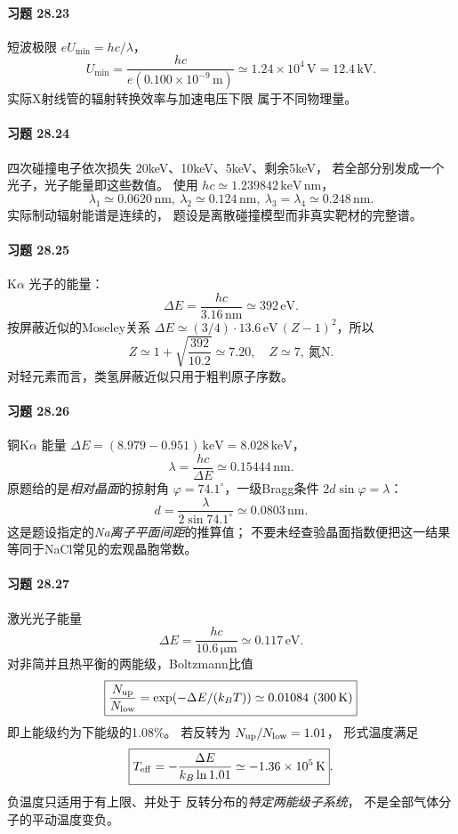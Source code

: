 \paragraph{习题 28.23}
短波极限 \(eU_{\min}=hc/\lambda\)，
\[
\boxed{U_{\min}
=\frac{hc}{e(0.100\times10^{-9}\,\mathrm m)}
\simeq1.24\times10^4\,\mathrm V=12.4\,\mathrm{kV}}.
\]
实际X射线管的辐射转换效率与加速电压下限
属于不同物理量。

\paragraph{习题 28.24}
四次碰撞电子依次损失
20keV、10keV、5keV、剩余5keV，
若全部分别发成一个光子，光子能量即这些数值。
使用 \(hc\simeq1.239842\,\mathrm{keV\,nm}\)，
\[
\boxed{\lambda_1\simeq0.0620\,\mathrm{nm}},\
\boxed{\lambda_2\simeq0.124\,\mathrm{nm}},\
\boxed{\lambda_3=\lambda_4\simeq0.248\,\mathrm{nm}}.
\]
实际制动辐射能谱是连续的，
题设是离散碰撞模型而非真实靶材的完整谱。

\paragraph{习题 28.25}
K\(\alpha\) 光子的能量：
\[
\boxed{\Delta E=\frac{hc}{3.16\,\mathrm{nm}}
\simeq392\,\mathrm{eV}}.
\]
按屏蔽近似的Moseley关系
\(\Delta E\simeq(3/4)\cdot13.6\,\mathrm{eV}
\,(Z-1)^2\)，所以
\[
Z\simeq1+\sqrt{\frac{392}{10.2}}
\simeq7.20,\quad
\boxed{Z\simeq7,\ \text{氮N}}.
\]
对轻元素而言，类氢屏蔽近似只用于粗判原子序数。

\paragraph{习题 28.26}
铜K\(\alpha\) 能量
\(\Delta E=(8.979-0.951)\,\mathrm{keV}
=8.028\,\mathrm{keV}\)，
\[
\lambda=\frac{hc}{\Delta E}\simeq0.15444\,\mathrm{nm}.
\]
原题给的是\emph{相对晶面}的掠射角
\(\varphi=74.1^\circ\)，一级Bragg条件
\(2d\sin\varphi=\lambda\)：
\[
\boxed{d=\frac{\lambda}{2\sin74.1^\circ}
\simeq0.0803\,\mathrm{nm}}.
\]
这是题设指定的\emph{Na离子平面间距}的推算值；
不要未经查验晶面指数便把这一结果
等同于NaCl常见的宏观晶胞常数。

\paragraph{习题 28.27}
激光光子能量
\[
\boxed{\Delta E=\frac{hc}{10.6\,\mathrm{\mu m}}
\simeq0.117\,\mathrm{eV}}.
\]
对非简并且热平衡的两能级，Boltzmann比值
\[
\boxed{\frac{N_{\rm up}}{N_{\rm low}}
=\exp(-\Delta E/(k_BT))
\simeq0.01084\ (300\,\mathrm K)}
\]
即上能级约为下能级的1.08\%。
若反转为 \(N_{\rm up}/N_{\rm low}=1.01\)，
形式温度满足
\[
\boxed{T_{\rm eff}
=-\frac{\Delta E}{k_B\ln1.01}
\simeq-1.36\times10^5\,\mathrm K}.
\]
负温度只适用于有上限、并处于
反转分布的\emph{特定两能级子系统}，
不是全部气体分子的平动温度变负。

